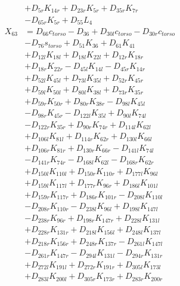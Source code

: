 \begin{multicols}{2}
\begin{align}
&+ D_{5r}K_{14r} + D_{23r}K_{5r} + D_{35r}K_{7r}  \nonumber \\
&- D_{65r}K_{5r} + D_{55}L_4 \nonumber \\
X_{63} &= D_{66}c_{torso} - D_{36} + D_{30l}c_{torso} - D_{30r}c_{torso}  \nonumber \\
&- D_{76}s_{torso} + D_{51}K_{36} + D_{61}K_{41}  \nonumber \\
&+ D_{12l}K_{18l} + D_{18l}K_{22l} + D_{12r}K_{18r}  \nonumber \\
&+ D_{18r}K_{22r} - D_{45l}K_{14l} - D_{45r}K_{14r}  \nonumber \\
&+ D_{52l}K_{45l} + D_{73l}K_{35l} + D_{52r}K_{45r}  \nonumber \\
&+ D_{59l}K_{50l} + D_{80l}K_{38l} + D_{73r}K_{35r}  \nonumber \\
&+ D_{59r}K_{50r} + D_{80r}K_{38r} - D_{98l}K_{45l}  \nonumber \\
&- D_{98r}K_{45r} - D_{122l}K_{35l} + D_{90l}K_{74l}  \nonumber \\
&- D_{122r}K_{35r} + D_{90r}K_{74r} + D_{114l}K_{62l}  \nonumber \\
&+ D_{106l}K_{81l} + D_{114r}K_{62r} + D_{130l}K_{66l}  \nonumber \\
&+ D_{106r}K_{81r} + D_{130r}K_{66r} - D_{141l}K_{74l}  \nonumber \\
&- D_{141r}K_{74r} - D_{168l}K_{62l} - D_{168r}K_{62r}  \nonumber \\
&+ D_{150l}K_{110l} + D_{150r}K_{110r} + D_{177l}K_{96l}  \nonumber \\
&+ D_{159l}K_{117l} + D_{177r}K_{96r} + D_{186l}K_{101l}  \nonumber \\
&+ D_{159r}K_{117r} + D_{186r}K_{101r} - D_{208l}K_{110l}  \nonumber \\
&- D_{208r}K_{110r} - D_{238l}K_{96l} + D_{198l}K_{147l}  \nonumber \\
&- D_{238r}K_{96r} + D_{198r}K_{147r} + D_{228l}K_{131l}  \nonumber \\
&+ D_{228r}K_{131r} + D_{218l}K_{156l} + D_{248l}K_{137l}  \nonumber \\
&+ D_{218r}K_{156r} + D_{248r}K_{137r} - D_{261l}K_{147l}  \nonumber \\
&- D_{261r}K_{147r} - D_{294l}K_{131l} - D_{294r}K_{131r}  \nonumber \\
&+ D_{272l}K_{191l} + D_{272r}K_{191r} + D_{305l}K_{173l}  \nonumber \\
&+ D_{283l}K_{200l} + D_{305r}K_{173r} + D_{283r}K_{200r}  \nonumber \\

\end{align}
\end{multicols}
